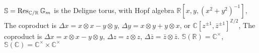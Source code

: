 \documentclass[main]{subfiles}
\begin{document}
\begin{example}
$\mathbb S=\operatorname{Res}_{\mathbb C/\mathbb R}\mathbb G_m$ is the Deligne torus, with Hopf algebra $\mathbb R[x,y,(x^2+y^2)^{-1}]$, The coproduct is $\Delta x=x\otimes x-y\otimes y$, $\Delta y=x\otimes y+y\otimes x$, or $\mathbb C[z^{\pm1},\bar z^{\pm1}]^{\mathbb Z/2}$, The coproduct is $\Delta x=x\otimes x-y\otimes y$, $\Delta z=z\otimes z$, $\Delta\bar z=\bar z\otimes\bar z$. $\mathbb S(\mathbb R)=\mathbb C^\times$, $\mathbb S(\mathbb C)=\mathbb C^\times\times\mathbb C^\times$
\end{example}
\end{document}
